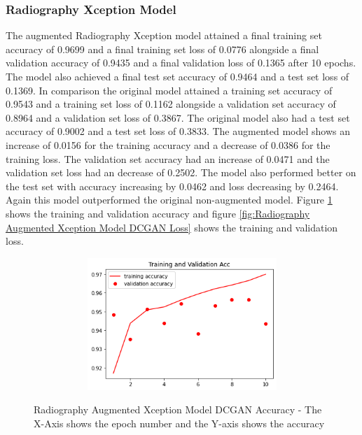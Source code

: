 \subsubsection{Radiography Xception Model}
The augmented Radiography Xception model attained a final training set accuracy of 0.9699 and a final training set loss of 0.0776 alongside a final validation accuracy of 0.9435 and a final validation loss of 0.1365 after 10 epochs.  The model also achieved a final test set accuracy of 0.9464 and a test set loss of 0.1369.  In comparison the original model attained a training set accuracy of 0.9543 and a training set loss of 0.1162  alongside a validation set accuracy of 0.8964 and a validation set loss of 0.3867.  The original model also had a test set accuracy of 0.9002 and a test set loss of 0.3833.  The augmented model shows an increase of 0.0156 for the training accuracy and a decrease of 0.0386 for the training loss.  The validation set accuracy had an increase of 0.0471 and the validation set loss had an decrease of 0.2502. The model also performed better on the test set with accuracy increasing by 0.0462 and loss decreasing by 0.2464.  Again this model outperformed the original non-augmented model. Figure \ref{fig:Radiography Augmented Xception Model DCGAN Accuracy} shows the training and validation accuracy and figure \ref{fig:Radiography Augmented Xception Model DCGAN Loss} shows the training and validation loss.
 \begin{figure}[H]
    \centering    \includegraphics[width=1\textwidth,height=5cm,keepaspectratio]{Images/RadiographyCNNXceptionTrainAndValAccAugmentedDCGAN.png}\\
    \caption{Radiography Augmented Xception Model DCGAN Accuracy - The X-Axis shows the epoch number and the Y-axis shows the accuracy}
    \label{fig:Radiography Augmented Xception Model DCGAN Accuracy}
\end{figure}
